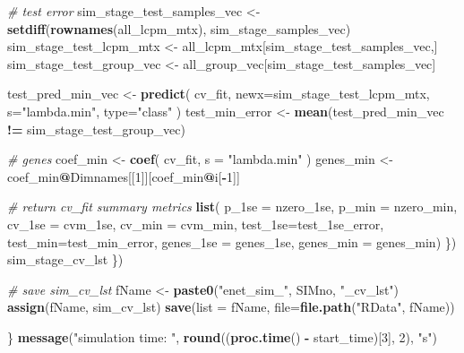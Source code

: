 \documentclass[
]{book}
\newenvironment{Shaded}{\begin{snugshade}}{\end{snugshade}}
\newcommand{\CommentTok}[1]{\textcolor[rgb]{0.56,0.35,0.01}{\textit{#1}}}
\newcommand{\DataTypeTok}[1]{\textcolor[rgb]{0.13,0.29,0.53}{#1}}
\newcommand{\DecValTok}[1]{\textcolor[rgb]{0.00,0.00,0.81}{#1}}
\newcommand{\KeywordTok}[1]{\textcolor[rgb]{0.13,0.29,0.53}{\textbf{#1}}}
\newcommand{\NormalTok}[1]{#1}
\newcommand{\OperatorTok}[1]{\textcolor[rgb]{0.81,0.36,0.00}{\textbf{#1}}}
\newcommand{\StringTok}[1]{\textcolor[rgb]{0.31,0.60,0.02}{#1}}
\begin{document}
\begin{Shaded}
\begin{Highlighting}[]
      \CommentTok{\# test error}
\NormalTok{      sim\_stage\_test\_samples\_vec <{-}}\StringTok{ }\KeywordTok{setdiff}\NormalTok{(}\KeywordTok{rownames}\NormalTok{(all\_lcpm\_mtx), sim\_stage\_samples\_vec)}
\NormalTok{      sim\_stage\_test\_lcpm\_mtx <{-}}\StringTok{ }\NormalTok{all\_lcpm\_mtx[sim\_stage\_test\_samples\_vec,]}
\NormalTok{      sim\_stage\_test\_group\_vec <{-}}\StringTok{ }\NormalTok{all\_group\_vec[sim\_stage\_test\_samples\_vec]}

\NormalTok{      test\_pred\_min\_vec <{-}}\StringTok{ }\KeywordTok{predict}\NormalTok{(}
\NormalTok{       cv\_fit,}
       \DataTypeTok{newx=}\NormalTok{sim\_stage\_test\_lcpm\_mtx,}
       \DataTypeTok{s=}\StringTok{"lambda.min"}\NormalTok{,}
       \DataTypeTok{type=}\StringTok{"class"}
\NormalTok{      )}
\NormalTok{      test\_min\_error <{-}}\StringTok{ }\KeywordTok{mean}\NormalTok{(test\_pred\_min\_vec }\OperatorTok{!=}\StringTok{ }\NormalTok{sim\_stage\_test\_group\_vec)}

      \CommentTok{\# genes}
\NormalTok{      coef\_min <{-}}\StringTok{ }\KeywordTok{coef}\NormalTok{(}
\NormalTok{        cv\_fit,}
        \DataTypeTok{s =} \StringTok{"lambda.min"}
\NormalTok{      )}
\NormalTok{      genes\_min <{-}}\StringTok{ }\NormalTok{coef\_min}\OperatorTok{@}\NormalTok{Dimnames[[}\DecValTok{1}\NormalTok{]][coef\_min}\OperatorTok{@}\NormalTok{i[}\OperatorTok{{-}}\DecValTok{1}\NormalTok{]]}

      \CommentTok{\# return cv\_fit summary metrics}
      \KeywordTok{list}\NormalTok{(}
       \DataTypeTok{p\_1se =}\NormalTok{ nzero\_1se, }
       \DataTypeTok{p\_min =}\NormalTok{ nzero\_min, }
       \DataTypeTok{cv\_1se =}\NormalTok{ cvm\_1se, }
       \DataTypeTok{cv\_min =}\NormalTok{ cvm\_min, }
       \DataTypeTok{test\_1se=}\NormalTok{test\_1se\_error, }
       \DataTypeTok{test\_min=}\NormalTok{test\_min\_error, }
       \DataTypeTok{genes\_1se =}\NormalTok{ genes\_1se,}
       \DataTypeTok{genes\_min =}\NormalTok{ genes\_min)}
\NormalTok{    \})}
\NormalTok{    sim\_stage\_cv\_lst}
\NormalTok{  \})}

  \CommentTok{\# save  sim\_cv\_lst}
\NormalTok{  fName <{-}}\StringTok{ }\KeywordTok{paste0}\NormalTok{(}\StringTok{"enet\_sim\_"}\NormalTok{, SIMno, }\StringTok{"\_cv\_lst"}\NormalTok{)}
  \KeywordTok{assign}\NormalTok{(fName, sim\_cv\_lst)}
  \KeywordTok{save}\NormalTok{(}\DataTypeTok{list =}\NormalTok{ fName, }\DataTypeTok{file=}\KeywordTok{file.path}\NormalTok{(}\StringTok{"RData"}\NormalTok{, fName))}

\NormalTok{\}}
  \KeywordTok{message}\NormalTok{(}\StringTok{"simulation time: "}\NormalTok{, }\KeywordTok{round}\NormalTok{((}\KeywordTok{proc.time}\NormalTok{() }\OperatorTok{{-}}\StringTok{ }\NormalTok{start\_time)[}\DecValTok{3}\NormalTok{], }\DecValTok{2}\NormalTok{), }\StringTok{"s"}\NormalTok{)}
\end{Highlighting}
\end{Shaded}
\end{document}
